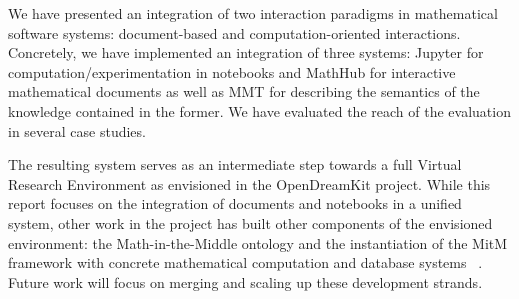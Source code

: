 
We have presented an integration of two interaction paradigms in mathematical software systems: document-based and computation-oriented interactions. Concretely, we have implemented an integration of three systems:
Jupyter for computation/experimentation in notebooks and MathHub for interactive mathematical documents as well as MMT for describing the semantics of the knowledge contained in the former.
We have evaluated the reach of the evaluation in several case studies.

The resulting system serves as an intermediate step towards a full Virtual Research Environment as envisioned in the OpenDreamKit project. While this report focuses on the integration of documents and notebooks in a unified system, other work in the project has built other components of the envisioned environment: the Math-in-the-Middle ontology \cite{KohMuePfe:kbimss17} and the instantiation of the MitM framework with concrete mathematical computation and database systems ~\cite{WieKohRab:vtuimkb17}.
Future work will focus on merging and scaling up these development strands.


